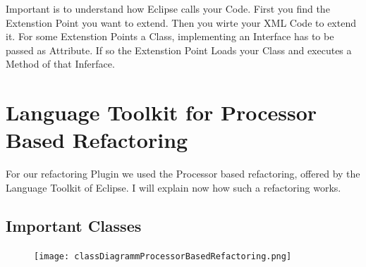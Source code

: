 \documentclass[a4paper,10pt]{report}
\begin{document}
Important is to understand how Eclipse calls your Code. First you find the Extenstion Point you want to extend. Then you wirte your XML Code to extend it. For some Extenstion Points a Class, implementing an Interface has to be passed as Attribute. If so the Extenstion Point Loads your Class and executes a Method of that Inferface.


\chapter{Language Toolkit for Processor Based Refactoring}
\label{languageToolkitForProcessorBasedRefactoring}
For our refactoring Plugin we used the Processor based refactoring, offered by the Language Toolkit of Eclipse. I will explain now how such a refactoring works.
\section{Important Classes}

\begin{figure}[h]
\centering
\texttt{[image: classDiagrammProcessorBasedRefactoring.png]}
\end{figure}
\end{document}
